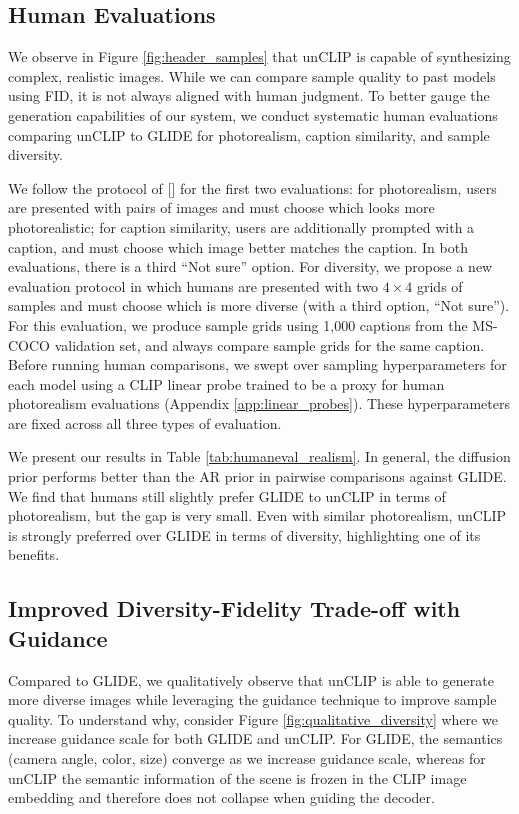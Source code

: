 \subsection{Human Evaluations}
\label{sec:human_evals}

We observe in Figure \ref{fig:header_samples} that unCLIP is capable of synthesizing complex, realistic images. While we can compare sample quality to past models using FID, it is not always aligned with human judgment. To better gauge the generation capabilities of our system, we conduct systematic human evaluations comparing unCLIP to GLIDE for photorealism, caption similarity, and sample diversity. 

We follow the protocol of \citeauthor{dalle,glide} [] for the first two evaluations: for photorealism, users are presented with pairs of images and must choose which looks more photorealistic; for caption similarity, users are additionally prompted with a caption, and must choose which image better matches the caption. In both evaluations, there is a third ``Not sure'' option. For diversity, we propose a new evaluation protocol in which humans are presented with two $4 \times 4$ grids of samples and must choose which is more diverse (with a third option, ``Not sure''). For this evaluation, we produce sample grids using 1,000 captions from the MS-COCO validation set, and always compare sample grids for the same caption. Before running human comparisons, we swept over sampling hyperparameters for each model using a CLIP linear probe trained to be a proxy for human photorealism evaluations (Appendix \ref{app:linear_probes}). These hyperparameters are fixed across all three types of evaluation.

We present our results in Table \ref{tab:humaneval_realism}. In general, the diffusion prior performs better than the AR prior in pairwise comparisons against GLIDE. We find that humans still slightly prefer GLIDE to unCLIP in terms of photorealism, but the gap is very small. Even with similar photorealism, unCLIP is strongly preferred over GLIDE in terms of diversity, highlighting one of its benefits.

\subsection{Improved Diversity-Fidelity Trade-off with Guidance}
\label{sec:tradeoff}

Compared to GLIDE, we qualitatively observe that unCLIP is able to generate more diverse images while leveraging the guidance technique to improve sample quality. To understand why, consider Figure \ref{fig:qualitative_diversity} where we increase guidance scale for both GLIDE and unCLIP. For GLIDE, the semantics (camera angle, color, size) converge as we increase guidance scale, whereas for unCLIP the semantic information of the scene is frozen in the CLIP image embedding and therefore does not collapse when guiding the decoder. 


